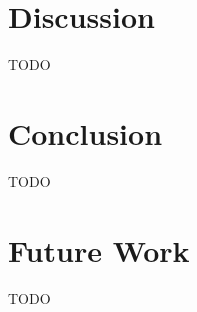 \documentclass[conference]{IEEEtran}
\begin{document}

\section{Discussion}\label{sec:disc}

TODO


\section{Conclusion}\label{sec:conc}

TODO


\section{Future Work}\label{sec:futwork}

TODO


\printbibliography
\end{document}
